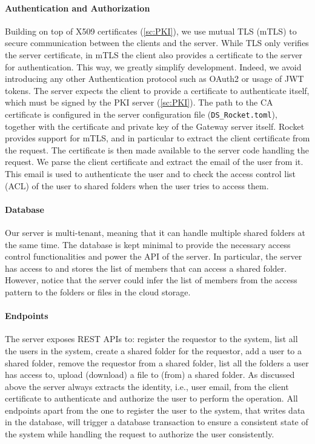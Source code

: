 \paragraph{Authentication and Authorization}
Building on top of X509 certificates (\cref{sc:PKI}), we use
mutual TLS (mTLS) to 
secure communication between the clients and the server.
While TLS only verifies the server certificate,
in mTLS the client also provides a certificate to the server
for authentication.
This way, we greatly simplify development. Indeed, we 
avoid introducing any other Authentication
protocol such as OAuth2 or usage of JWT tokens. 
The server expects the client to provide a certificate
to authenticate itself, which must be signed by the
PKI server (\cref{sc:PKI}).
The path to the CA certificate is configured in the
server configuration file (\texttt{DS\_Rocket.toml}),
together with the certificate and private key of the
Gateway server itself. Rocket provides support for
mTLS, and in particular to extract the client
certificate from the request. The certificate is then
made available to the server code handling the request.
We parse the client certificate and extract the email
of the user from it. This email is used to authenticate
the user and to check the access control list (ACL)
of the user to shared folders when the user tries to
access them.

\paragraph{Database}
Our server is multi-tenant, meaning that it can handle
multiple shared folders at the same time.
The database is kept minimal to provide the necessary 
access control functionalities and power the
API of the server. In particular, the server has access to
and stores the list of members that can access a shared folder.
However, notice that the server could infer the list of members
from the access pattern to the folders or files
in the cloud storage.


\paragraph{Endpoints}
The server exposes REST APIs to: register the requestor to the system,
list all the users in the system,
create a shared folder for the requestor,
add a user to a shared folder,
remove the requestor from a shared folder,
list all the folders a user has access to,
upload (download) a file to (from) a shared folder.
As discussed above the server always extracts the identity,
i.e., user email, from the client certificate to authenticate
and authorize the user to perform the operation.
All endpoints apart from the one to register the user
to the system, that writes data in the database,
will trigger a database transaction 
to ensure a consistent state of the system while
handling the request to authorize the
user consistently.

